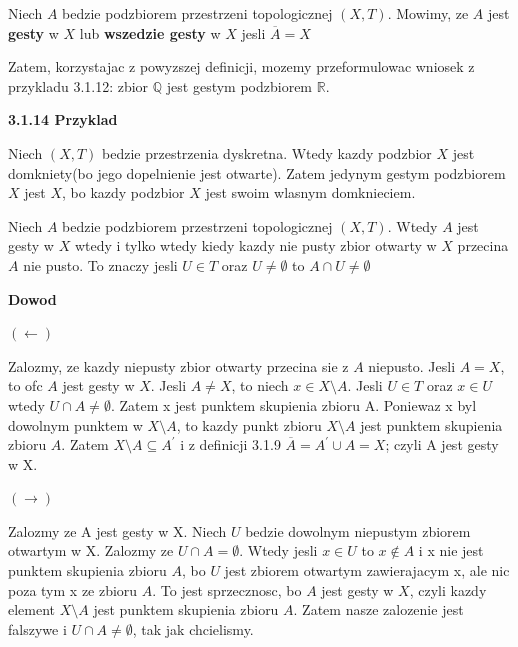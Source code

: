 \documentclass{article}
\begin{document}
\begin{tcolorbox}[colback=white!90!red,colframe=black!35!red,title=3.1.13 Definicja: Gestosc]

    Niech $A$ bedzie podzbiorem przestrzeni topologicznej $(X,T)$. Mowimy, ze $A$ jest \textbf{gesty} w $X$ lub \textbf{wszedzie gesty} w $X$ jesli $\overline{A} = X$

\end{tcolorbox}

Zatem, korzystajac z powyzszej definicji, mozemy przeformulowac wniosek z przykladu 3.1.12: zbior $\mathbb{Q}$ jest gestym podzbiorem $\mathbb{R}$.

\textbf{3.1.14 Przyklad}

Niech $(X,T)$ bedzie przestrzenia dyskretna. Wtedy kazdy podzbior $X$ jest domkniety(bo jego dopelnienie jest otwarte). Zatem jedynym gestym podzbiorem $X$ jest $X$, bo kazdy podzbior $X$ jest swoim wlasnym domknieciem.


\begin{tcolorbox}[colback=white!90!green,colframe=black!35!green,title=3.1.15 Lematokomentarz: Gesty zbior A przecina niepusto wszystkie zbiory otwarte]

Niech $A$ bedzie podzbiorem przestrzeni topologicznej $(X,T)$. Wtedy $A$ jest gesty w $X$ wtedy i tylko wtedy kiedy kazdy nie pusty zbior otwarty w $X$ przecina $A$ nie pusto. To znaczy jesli $U \in T$ oraz $U \neq \emptyset$ to $A \cap U \neq \emptyset$

\end{tcolorbox}

\textbf{Dowod}

$(\leftarrow)$

Zalozmy, ze kazdy niepusty zbior otwarty przecina sie z $A$ niepusto. Jesli $A=X$, to ofc $A$ jest gesty w $X$. Jesli $A \neq X$, to niech $x \in X\setminus A$. Jesli $U \in T$ oraz $x \in U$ wtedy $U \cap A \neq \emptyset$. Zatem x jest punktem skupienia zbioru A. Poniewaz x byl dowolnym punktem w $X\setminus A$, to kazdy punkt zbioru $X\setminus A$ jest punktem skupienia zbioru $A$. Zatem $X\setminus A \subseteq A^{\prime}$ i z definicji 3.1.9 $\overline{A} = A^{\prime} \cup A = X$; czyli A jest gesty w X.

$(\rightarrow)$

Zalozmy ze A jest gesty w X. Niech $U$ bedzie dowolnym niepustym zbiorem otwartym w X. Zalozmy ze $U\cap A = \emptyset$. Wtedy jesli $x\in U$ to $x \not\in A$ i x nie jest punktem skupienia zbioru $A$, bo $U$ jest zbiorem otwartym zawierajacym x, ale nic poza tym x ze zbioru $A$. To jest sprzecznosc, bo $A$ jest gesty w $X$, czyli kazdy element $X\setminus A$ jest punktem skupienia zbioru $A$. Zatem nasze zalozenie jest falszywe i $U\cap A \neq \emptyset$, tak jak chcielismy.
\end{document}
